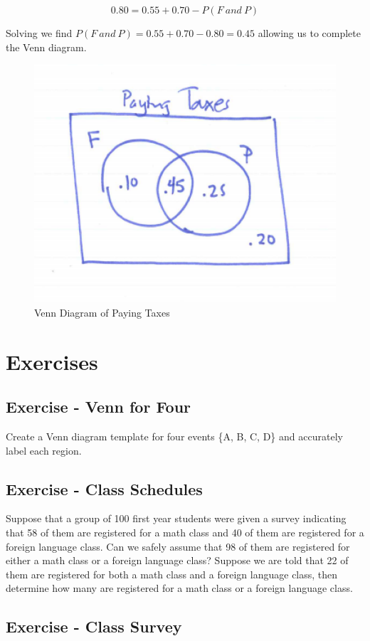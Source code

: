 \documentclass[]{book}
\theoremstyle{definition}
\theoremstyle{definition}
\theoremstyle{definition}
\theoremstyle{remark}
\begin{document}
\[0.80=0.55+0.70-P(F \ and \ P)\]

Solving we find \(P(F \ and \ P)=0.55 + 0.70 - 0.80=0.45\) allowing us
to complete the Venn diagram.

\begin{figure}

{\centering \includegraphics[width=0.3\linewidth]{01-basics-figures/venn_paying_taxes} 

}

\caption{Venn Diagram of Paying Taxes}\label{fig:nice-fig-53}
\end{figure}

\section{Exercises}\label{exercises}

\subsection{Exercise - Venn for Four}\label{exercise---venn-for-four}

Create a Venn diagram template for four events \{A, B, C, D\} and
accurately label each region.

\subsection{Exercise - Class
Schedules}\label{exercise---class-schedules}

Suppose that a group of 100 first year students were given a survey
indicating that 58 of them are registered for a math class and 40 of
them are registered for a foreign language class. Can we safely assume
that 98 of them are registered for either a math class or a foreign
language class? Suppose we are told that 22 of them are registered for
both a math class and a foreign language class, then determine how many
are registered for a math class or a foreign language class.

\subsection{Exercise - Class Survey}\label{exercise---class-survey}
\end{document}
